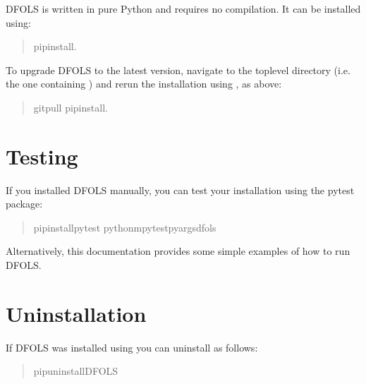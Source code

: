 \documentclass[letterpaper,10pt,english]{sphinxmanual}
\begin{document}
\sphinxAtStartPar
DFO\sphinxhyphen{}LS is written in pure Python and requires no compilation. It can be installed using:
\begin{quote}

\begin{sphinxVerbatim}[commandchars=\\\{\}]
\PYGZdl{}pipinstall.
\end{sphinxVerbatim}
\end{quote}

\sphinxAtStartPar
To upgrade DFO\sphinxhyphen{}LS to the latest version, navigate to the top\sphinxhyphen{}level directory (i.e. the one containing ) and rerun the installation using , as above:
\begin{quote}

\begin{sphinxVerbatim}[commandchars=\\\{\}]
\PYGZdl{}gitpull
\PYGZdl{}pipinstall.
\end{sphinxVerbatim}
\end{quote}


\section{Testing}
\label{\detokenize{install:testing}}
\sphinxAtStartPar
If you installed DFO\sphinxhyphen{}LS manually, you can test your installation using the pytest package:
\begin{quote}

\begin{sphinxVerbatim}[commandchars=\\\{\}]
\PYGZdl{}pipinstallpytest
\PYGZdl{}python\PYGZhy{}mpytest\PYGZhy{}\PYGZhy{}pyargsdfols
\end{sphinxVerbatim}
\end{quote}

\sphinxAtStartPar
Alternatively, this documentation provides some simple examples of how to run DFO\sphinxhyphen{}LS.


\section{Uninstallation}
\label{\detokenize{install:uninstallation}}
\sphinxAtStartPar
If DFO\sphinxhyphen{}LS was installed using  you can uninstall as follows:
\begin{quote}

\begin{sphinxVerbatim}[commandchars=\\\{\}]
\PYGZdl{}pipuninstallDFO\PYGZhy{}LS
\end{sphinxVerbatim}
\end{quote}
\end{document}
